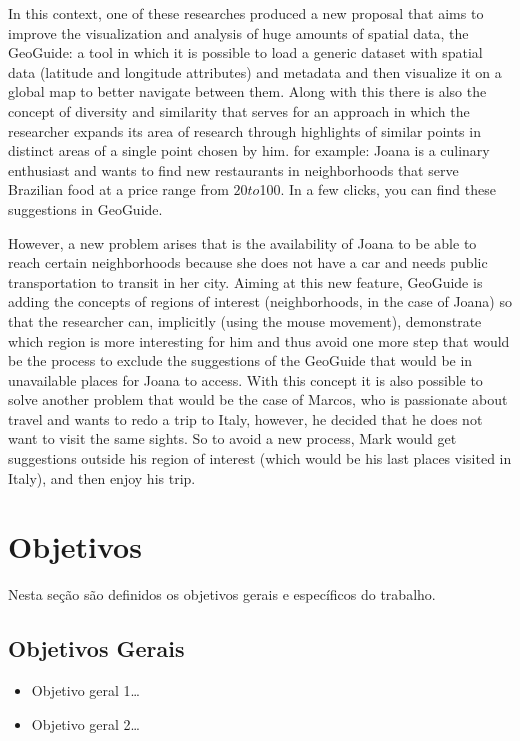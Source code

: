 In this context, one of these researches produced a new proposal that aims to 
improve the visualization and analysis of huge amounts of spatial data, the 
GeoGuide: a tool in which it is possible to load a generic dataset with spatial 
data (latitude and longitude attributes) and metadata and then visualize it on a 
global map to better navigate between them. Along with this there is also the 
concept of diversity and similarity that serves for an approach in which the
researcher expands its area of research through highlights of similar points in 
distinct areas of a single point chosen by him. for example: Joana is a culinary
enthusiast and wants to find new restaurants in neighborhoods that serve Brazilian
food at a price range from $20 to $100. In a few clicks, you can find these 
suggestions in GeoGuide.

However, a new problem arises that is the availability of Joana to be able to 
reach certain neighborhoods because she does not have a car and needs public 
transportation to transit in her city. Aiming at this new feature, GeoGuide is 
adding the concepts of regions of interest (neighborhoods, in the case of Joana) 
so that the researcher can, implicitly (using the mouse movement), demonstrate 
which region is more interesting for him and thus avoid one more step that would 
be the process to exclude the suggestions of the GeoGuide that would be in unavailable
places for Joana to access. With this concept it is also possible to solve another
problem that would be the case of Marcos, who is passionate about travel and wants
to redo a trip to Italy, however, he decided that he does not want to visit the 
same sights. So to avoid a new process, Mark would get suggestions outside his 
region of interest (which would be his last places visited in Italy), and then 
enjoy his trip.


\section{Objetivos}

Nesta seção são definidos os objetivos gerais e específicos do trabalho.

\subsection{Objetivos Gerais}

\begin{itemize}
  \item Objetivo geral 1\ldots
  \item Objetivo geral 2\ldots  
\end{itemize}

